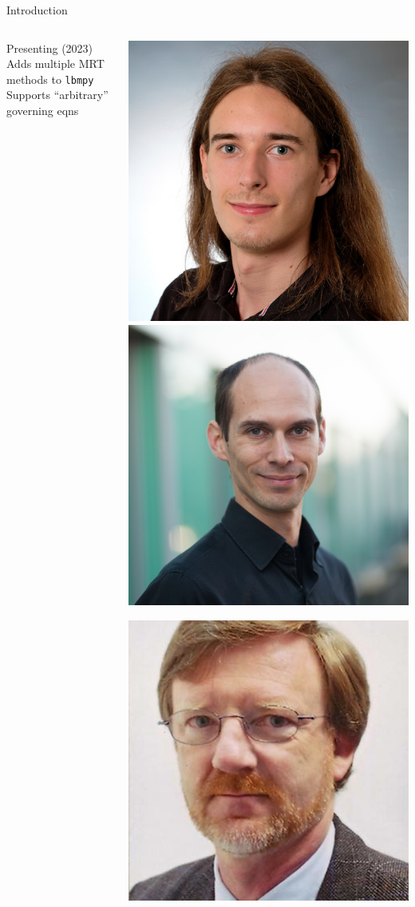 \placelogofalse
\begin{frame}{Introduction}
\begin{columns}
\begin{outline}
  \1 Presenting \cite{Hennig2023} (2023)
  \2 Adds multiple MRT methods to \lstinline{lbmpy}
  \2 Supports ``arbitrary'' governing eqns
\end{outline}
\begin{center}

  \includegraphics[width=0.3\linewidth]{frederik_hennig.jpg}
  \includegraphics[width=0.3\linewidth]{markus_holzer.jpg}

  \includegraphics[width=0.3\linewidth]{ulrich_rude.jpg}
\end{center} 
\end{columns}
\end{frame}
\placelogotrue

